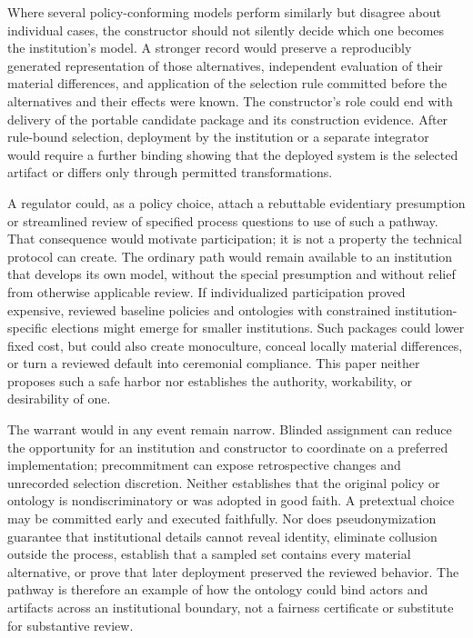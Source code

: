 Where several policy-conforming models perform similarly but disagree about
individual cases, the constructor should not silently decide which one becomes
the institution's model. A stronger record would preserve a reproducibly
generated representation of those alternatives, independent evaluation of their
material differences, and application of the selection rule committed before
the alternatives and their effects were known. The constructor's role could end
with delivery of the portable candidate package and its construction evidence.
After rule-bound selection, deployment by the institution or a separate
integrator would require a further binding showing that the deployed system is
the selected artifact or differs only through permitted transformations.

A regulator could, as a policy choice, attach a rebuttable evidentiary
presumption or streamlined review of specified process questions to use of such
a pathway. That consequence would motivate participation; it is not a property
the technical protocol can create. The ordinary path would remain available to
an institution that develops its own model, without the special presumption and
without relief from otherwise applicable review. If individualized participation
proved expensive, reviewed baseline policies and ontologies with constrained
institution-specific elections might emerge for smaller institutions. Such
packages could lower fixed cost, but could also create monoculture, conceal
locally material differences, or turn a reviewed default into ceremonial
compliance. This paper neither proposes such a safe harbor nor establishes the
authority, workability, or desirability of one.

The warrant would in any event remain narrow. Blinded assignment can reduce the
opportunity for an institution and constructor to coordinate on a preferred
implementation; precommitment can expose retrospective changes and unrecorded
selection discretion. Neither establishes that the original policy or ontology
is nondiscriminatory or was adopted in good faith. A pretextual choice may be
committed early and executed faithfully. Nor does pseudonymization guarantee
that institutional details cannot reveal identity, eliminate collusion outside
the process, establish that a sampled set contains every material alternative,
or prove that later deployment preserved the reviewed behavior. The pathway is
therefore an example of how the ontology could bind actors and artifacts across
an institutional boundary, not a fairness certificate or substitute for
substantive review.

